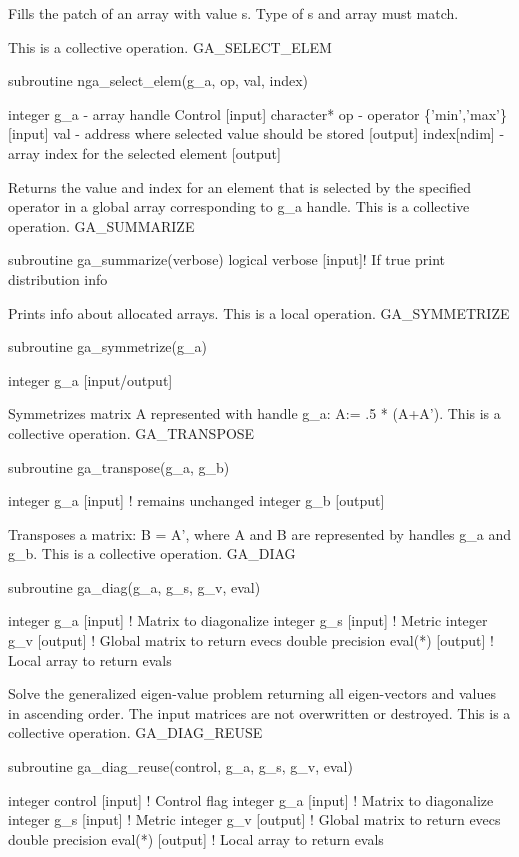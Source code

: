 Fills the patch of an array with value s. Type of s and array must
match.

This is a collective operation. GA\_SELECT\_ELEM

subroutine nga\_select\_elem(g\_a, op, val, index)

integer g\_a - array handle Control {[}input{]} character{*} op -
operator \{'min','max'\} {[}input{]} val - address where selected
value should be stored {[}output{]} index{[}ndim{]} - array index
for the selected element {[}output{]}

Returns the value and index for an element that is selected by the
specified operator in a global array corresponding to g\_a handle.
This is a collective operation. GA\_SUMMARIZE

subroutine ga\_summarize(verbose) logical verbose {[}input{]}! If
true print distribution info

Prints info about allocated arrays. This is a local operation. GA\_SYMMETRIZE

subroutine ga\_symmetrize(g\_a)

integer g\_a {[}input/output{]}

Symmetrizes matrix A represented with handle g\_a: A:= .5 {*} (A+A').
This is a collective operation. GA\_TRANSPOSE

subroutine ga\_transpose(g\_a, g\_b)

integer g\_a {[}input{]} ! remains unchanged integer g\_b {[}output{]}

Transposes a matrix: B = A', where A and B are represented by handles
g\_a and g\_b. This is a collective operation. GA\_DIAG

subroutine ga\_diag(g\_a, g\_s, g\_v, eval)

integer g\_a {[}input{]} ! Matrix to diagonalize integer g\_s {[}input{]}
! Metric integer g\_v {[}output{]} ! Global matrix to return evecs
double precision eval({*}) {[}output{]} ! Local array to return evals

Solve the generalized eigen-value problem returning all eigen-vectors
and values in ascending order. The input matrices are not overwritten
or destroyed. This is a collective operation. GA\_DIAG\_REUSE

subroutine ga\_diag\_reuse(control, g\_a, g\_s, g\_v, eval)

integer control {[}input{]} ! Control flag integer g\_a {[}input{]}
! Matrix to diagonalize integer g\_s {[}input{]} ! Metric integer
g\_v {[}output{]} ! Global matrix to return evecs double precision
eval({*}) {[}output{]} ! Local array to return evals

